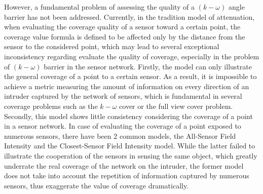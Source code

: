 \documentclass[3p]{elsarticle}
\begin{document}
%
However, a fundamental problem of assessing the quality of a $(k-\omega)$ angle barrier has not been addressed. Currently, in the tradition model of attenuation, when evaluating the coverage quality of a sensor toward a certain point, the coverage value formula is defined to be affected only by the distance from the sensor to the considered point, which may lead to several exceptional inconsistency regarding evaluate the quality of coverage, especially in the problem of $(k-\omega)$ barrier in the sensor network. Firstly, the model can only illustrate the general coverage of a point to a certain sensor. As a result, it is impossible to achieve a metric measuring the amount of information on every direction of an intruder captured by the network of sensors, which is fundamental in several coverage problems such as the $k-\omega$ cover or the full view cover problem. Secondly, this model shows little consistency considering the coverage of a point in a sensor network. In case of evaluating the coverage of a point exposed to numerous sensors, there have been 2 common models, the All-Sensor Field Intensity and the Closest-Sensor Field Intensity model. While the latter failed to illustrate the cooperation of the sensors in sensing the same object, which greatly underrate the real coverage of the network on the intruder, the former model does not take into account the repetition of information captured by numerous sensors, thus exaggerate the value of coverage dramatically.\par
\end{document}

